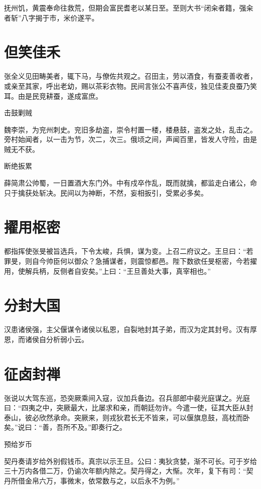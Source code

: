 \documentclass[a4paper,12pt,UTF8,twoside]{ctexbook}
\begin{document}
    抚州饥，黄震奉命往救荒，但期会富民耆老以某日至。至则大书“闭籴者籍，强籴者斩”八字揭于市，米价遂平。
    
    \section{但笑佳禾}
    
    张全义见田畴美者，辄下马，与僚佐共观之。召田主，劳以酒食，有蚕麦善收者，或亲至其家，呼出老幼，赐以茶彩衣物。民间言张公不喜声伎，独见佳麦良蚕乃笑耳。由是民竞耕蚕，遂成富庶。
    
    击鼓剿贼
    
    魏李崇，为兖州刺史。兖旧多劫盗，崇令村置一楼，楼悬鼓，盗发之处，乱击之。旁村始闻者，以一击为节，次二，次三。俄顷之间，声闻百里，皆发人守险，由是贼无不获。
    
    断绝扳累
    
    薛简肃公帅蜀，一日置酒大东门外。中有戍卒作乱，既而就擒，都监走白诸公，命只于擒获处斩决。民间以为神断，不然，妄相扳引，受累必多矣。
    
    \section{擢用枢密}
    
    都指挥使张旻被旨选兵，下令太峻，兵惧，谋为变。上召二府议之。王旦曰：“若罪旻，则自今帅臣何以御众？急捕谋者，则震惊都邑。陛下数欲任旻枢密，今若擢用，使解兵柄，反侧者自安矣。”上曰：“王旦善处大事，真宰相也。”
    
    \section{分封大国}
    
    汉患诸侯强，主父偃谋令诸侯以私恩，自裂地封其子弟，而汉为定其封号。汉有厚恩，而诸侯自分析弱小云。
    
    \section{征卤封禅}
    
    张说以大驾东巡，恐突厥乘间入寇，议加兵备边。召兵部郎中裴光庭谋之。光庭曰：“四夷之中，突厥最大，比屡求和亲，而朝廷勿许。今遣一使，征其大臣从封泰山，彼必欣然承命。突厥来，则戎狄君长无不皆来，可以偃旗息鼓，高枕而卧矣。”说曰：“善，吾所不及。”即奏行之。
    
    预给岁币
    
    契丹奏请岁给外别假钱币。真宗以示王旦。公曰：夷狄贪婪，渐不可长。可于岁给三十万内各借二万，仍谕次年额内除之。契丹得之，大惭。次年，复下有司：“契丹所借金帛六万，事微末，依常数与之，以后永不为例。”
    
\end{document}
